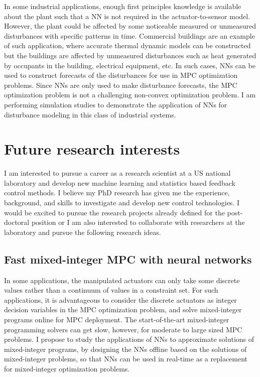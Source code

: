 \documentclass[11pt, a4paper]{article} %
\begin{document}
In some industrial applications, enough first principles knowledge is available 
about the plant such that a NN is not required in the actuator-to-sensor model. 
However, the plant could be affected by some noticeable measured or unmeasured 
disturbances with specific patterns in time. Commercial buildings are an 
example of such application, where accurate thermal dynamic models can be 
constructed but the buildings are affected by unmeasured disturbances such as 
heat generated by occupants in the building, electrical equipment, etc. In such 
cases, NNs can be used to construct forecasts of the disturbances for use in 
MPC optimization problems. Since NNs are only used to make disturbance 
forecasts, the MPC optimization problem is not a challenging non-convex 
optimization problem. I am performing simulation studies to demonstrate the 
application of NNs for disturbance modeling in this class of industrial systems.

\section*{Future research interests}

I am interested to pursue a career as a research scientist at a US national 
laboratory and develop new machine learning and statistics based 
feedback control methods. I believe my PhD research has given me the 
experience, background, and skills to investigate and develop new control 
technologies. I would be excited to pursue the research projects already 
defined for the post-doctoral position or I am also interested to collaborate 
with researchers at the laboratory and pursue the following research ideas.

\subsection*{Fast mixed-integer MPC with neural networks}

In some applications, the manipulated actuators can only take some 
discrete values rather than a continuum of values in a constraint set. For such 
applications, it is advantageous to consider the discrete actuators as integer 
decision variables in the MPC optimization problem, and solve mixed-integer 
programs online for MPC deployment. The start-of-the-art mixed-integer 
programming solvers can get slow, however, for moderate to large sized MPC 
problems. I propose to study the applications of NNs to approximate solutions 
of mixed-integer programs, by designing the NNs offline based on the solutions 
of mixed-integer problems, so that NNs can be used in real-time as a 
replacement for  mixed-integer optimization problems.
\end{document}
